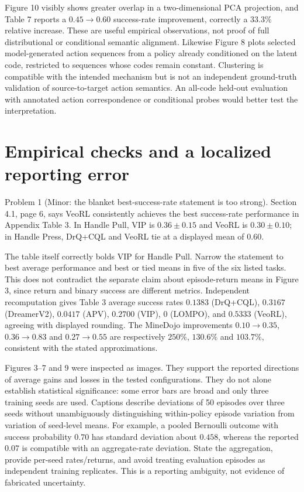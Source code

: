 \documentclass[10pt]{article}
\begin{document}
Figure 10 visibly shows greater overlap in a two-dimensional PCA projection, and Table 7 reports a \(0.45\to0.60\) success-rate improvement, correctly a \(33.3\%\) relative increase. These are useful empirical observations, not proof of full distributional or conditional semantic alignment. Likewise Figure 8 plots selected model-generated action sequences from a policy already conditioned on the latent code, restricted to sequences whose codes remain constant. Clustering is compatible with the intended mechanism but is not an independent ground-truth validation of source-to-target action semantics. An all-code held-out evaluation with annotated action correspondence or conditional probes would better test the interpretation.\par
\section*{Empirical checks and a localized reporting error}
Problem 1 (Minor: the blanket best-success-rate statement is too strong).  Section 4.1, page 6, says VeoRL consistently achieves the best success-rate performance in Appendix Table 3. In Handle Pull, VIP is \(0.36\pm0.15\) and VeoRL is \(0.30\pm0.10\); in Handle Press, DrQ+CQL and VeoRL tie at a displayed mean of \(0.60\).\par
The table itself correctly bolds VIP for Handle Pull. Narrow the statement to best average performance and best or tied means in five of the six listed tasks. This does not contradict the separate claim about episode-return means in Figure 3, since return and binary success are different metrics. Independent recomputation gives Table 3 average success rates \(0.1383\) (DrQ+CQL), \(0.3167\) (DreamerV2), \(0.0417\) (APV), \(0.2700\) (VIP), \(0\) (LOMPO), and \(0.5333\) (VeoRL), agreeing with displayed rounding. The MineDojo improvements \(0.10\to0.35\), \(0.36\to0.83\) and \(0.27\to0.55\) are respectively \(250\%\), \(130.6\%\) and \(103.7\%\), consistent with the stated approximations.\par
Figures 3–7 and 9 were inspected as images. They support the reported directions of average gains and losses in the tested configurations. They do not alone establish statistical significance: some error bars are broad and only three training seeds are used. Captions describe deviations of 50 episodes over three seeds without unambiguously distinguishing within-policy episode variation from variation of seed-level means. For example, a pooled Bernoulli outcome with success probability \(0.70\) has standard deviation about \(0.458\), whereas the reported \(0.07\) is compatible with an aggregate-rate deviation. State the aggregation, provide per-seed rates/returns, and avoid treating evaluation episodes as independent training replicates. This is a reporting ambiguity, not evidence of fabricated uncertainty.\par
\end{document}
